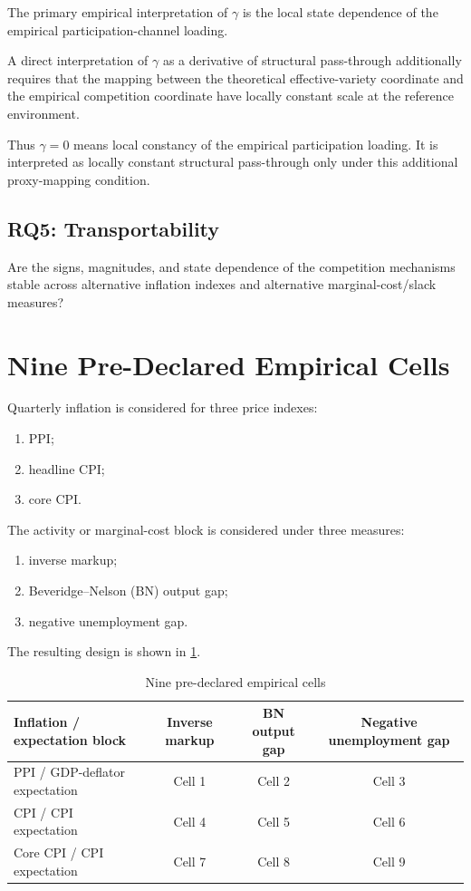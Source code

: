 \documentclass[11pt]{article}
\begin{document}
The primary empirical interpretation of \(\gamma\) is the local state dependence of the empirical participation-channel loading.

A direct interpretation of \(\gamma\) as a derivative of structural pass-through additionally requires that the mapping between the theoretical effective-variety coordinate and the empirical competition coordinate have locally constant scale at the reference environment.

Thus \(\gamma=0\) means local constancy of the empirical participation loading. It is interpreted as locally constant structural pass-through only under this additional proxy-mapping condition.

\subsection{RQ5: Transportability}

Are the signs, magnitudes, and state dependence of the competition mechanisms stable across alternative inflation indexes and alternative marginal-cost/slack measures?

\section{Nine Pre-Declared Empirical Cells}

Quarterly inflation is considered for three price indexes:
\begin{enumerate}
\item PPI;
\item headline CPI;
\item core CPI.
\end{enumerate}

The activity or marginal-cost block is considered under three measures:
\begin{enumerate}
\item inverse markup;
\item Beveridge--Nelson (BN) output gap;
\item negative unemployment gap.
\end{enumerate}

The resulting design is shown in \cref{tab:nine_cells}.

\begin{table}[htbp]
\centering
\caption{Nine pre-declared empirical cells}
\label{tab:nine_cells}
\begin{tabular}{p{}ccc}
\toprule
Inflation / expectation block & Inverse markup & BN output gap & Negative unemployment gap \\
\midrule
PPI / GDP-deflator expectation & Cell 1 & Cell 2 & Cell 3 \\
CPI / CPI expectation & Cell 4 & Cell 5 & Cell 6 \\
Core CPI / CPI expectation & Cell 7 & Cell 8 & Cell 9 \\
\bottomrule
\end{tabular}
\end{table}
\end{document}
